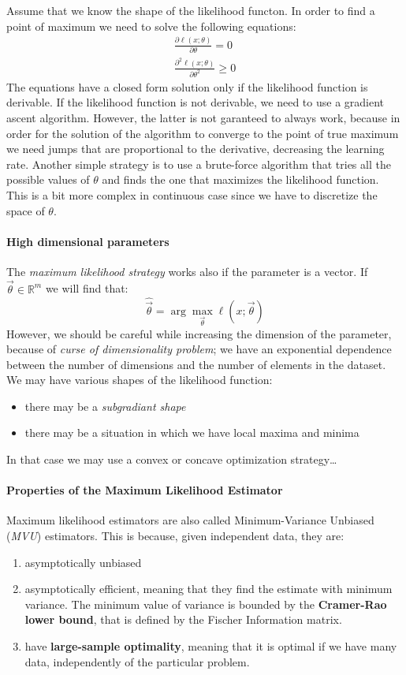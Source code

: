 Assume that we know the shape of the likelihood functon. In order to find a point of maximum we need to solve the following equations:
\begin{align*}
    \frac{\partial \ell(x;\theta)}{\partial \theta} = 0 \\
    \frac{\partial^2 \ell(x;\theta)}{\partial \theta^2} \geq 0
\end{align*}
The equations have a closed form solution only if the likelihood function is derivable. If the likelihood function is not derivable, we need to use a gradient ascent algorithm. However, the latter is not garanteed to always work, because in order for the solution of the algorithm to converge to the point of true maximum we need jumps that are proportional to the derivative, decreasing the learning rate.
Another simple strategy is to use a brute-force algorithm that tries all the possible values of $\theta$ and finds the one that maximizes the likelihood function. This is a bit more complex in continuous case since we have to discretize the space of $\theta$.

\paragraph*{High dimensional parameters}
The \textit{maximum likelihood strategy} works also if the parameter is a vector. If $\vec{\theta} \in \mathbb{R}^m$ we will find that:
\[
    \hat{\vec{\theta}} = \arg\max_{\vec{\theta}}  \ell(x; \vec{\theta}) %
\]
However, we should be careful while increasing the dimension of the parameter, because of \textit{curse of dimensionality problem}; we have an exponential dependence between the number of dimensions and the number of elements in the dataset.
We may have various shapes of the likelihood function:
\begin{itemize}
    \item there may be a \textit{subgradiant shape}
    \item there may be a situation in which we have local maxima and minima
\end{itemize}
In that case we may use a convex or concave optimization strategy\dots
\paragraph*{Properties of the Maximum Likelihood Estimator}
Maximum likelihood estimators are also called Minimum-Variance Unbiased (\textit{MVU}) estimators. This is because, given independent data, they are:
\begin{enumerate}
    \item asymptotically unbiased
    \item asymptotically efficient, meaning that they find the estimate with minimum variance. The minimum value of variance is bounded by the \textbf{Cramer-Rao lower bound}, that is defined by the Fischer Information matrix.
    \item have \textbf{large-sample optimality}, meaning that it is optimal if we have many data, independently of the particular problem.
\end{enumerate}

